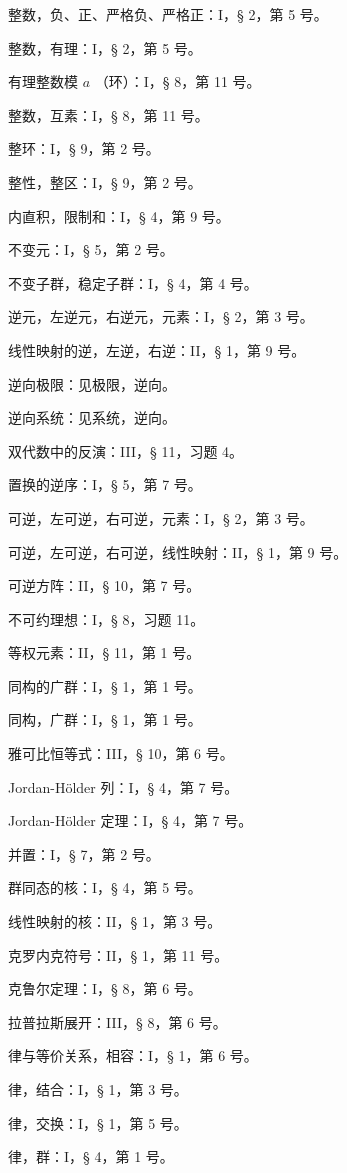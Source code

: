 整数，负、正、严格负、严格正：I，§ 2，第 5 号。

整数，有理：I，§ 2，第 5 号。

有理整数模 \(a\) （环）：I，§ 8，第 11 号。

整数，互素：I，§ 8，第 11 号。

整环：I，§ 9，第 2 号。

整性，整区：I，§ 9，第 2 号。

内直积，限制和：I，§ 4，第 9 号。

不变元：I，§ 5，第 2 号。

不变子群，稳定子群：I，§ 4，第 4 号。

逆元，左逆元，右逆元，元素：I，§ 2，第 3 号。

线性映射的逆，左逆，右逆：II，§ 1，第 9 号。

逆向极限：见极限，逆向。

逆向系统：见系统，逆向。

双代数中的反演：III，§ 11，习题 4。

置换的逆序：I，§ 5，第 7 号。

可逆，左可逆，右可逆，元素：I，§ 2，第 3 号。

可逆，左可逆，右可逆，线性映射：II，§ 1，第 9 号。

可逆方阵：II，§ 10，第 7 号。

不可约理想：I，§ 8，习题 11。

等权元素：II，§ 11，第 1 号。

同构的广群：I，§ 1，第 1 号。

同构，广群：I，§ 1，第 1 号。

雅可比恒等式：III，§ 10，第 6 号。

Jordan-Hölder 列：I，§ 4，第 7 号。

Jordan-Hölder 定理：I，§ 4，第 7 号。

并置：I，§ 7，第 2 号。

群同态的核：I，§ 4，第 5 号。

线性映射的核：II，§ 1，第 3 号。

克罗内克符号：II，§ 1，第 11 号。

克鲁尔定理：I，§ 8，第 6 号。

拉普拉斯展开：III，§ 8，第 6 号。

律与等价关系，相容：I，§ 1，第 6 号。

律，结合：I，§ 1，第 3 号。

律，交换：I，§ 1，第 5 号。

律，群：I，§ 4，第 1 号。

